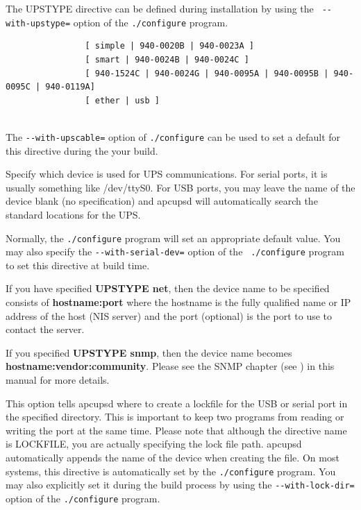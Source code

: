 {{{{{{{{{\begin{description}
The UPSTYPE directive can be defined during installation by using the {\tt
\verb{--{with-upstype=} option of the {\tt ./configure} program.  

\item [UPSCABLE \lt{}type of cable you are using\gt{}\gt{}]

\footnotesize
\begin{verbatim}
                [ simple | 940-0020B | 940-0023A ]
                [ smart | 940-0024B | 940-0024C ]
                [ 940-1524C | 940-0024G | 940-0095A | 940-0095B | 940-0095C | 940-0119A]
                [ ether | usb ]
     
\end{verbatim}
\normalsize

The {\tt \verb{--{with-upscable=} option of {\tt ./configure} can be used to set a
default for this directive during the your build.  

\item [DEVICE \lt{}name of device\gt{}]
   Specify which device is used for UPS communications. For serial ports, it is
usually something like /dev/ttyS0. For USB ports, you may leave the name of
the device blank (no specification) and apcupsd will automatically search the
standard locations for the UPS.  

Normally, the {\tt ./configure} program will set an appropriate default value.
You may also specify the {\tt \verb{--{with-serial-dev=} option of the {\tt
./configure} program to set this directive at build time.  

If you have specified {\bf UPSTYPE net}, then the device name to be specified
consists of {\bf hostname:port} where the hostname is the fully qualified name
or IP address of the host (NIS server) and the port (optional) is the port to
use to contact the server.  

If you specified {\bf UPSTYPE snmp}, then the device name becomes {\bf
hostname:vendor:community}. Please see the SNMP chapter (see 
) in this
manual for more details.  

\item [LOCKFILE \lt{}path to lockfile\gt{}]
   This option tells apcupsd where to create a lockfile for the USB or serial
port in the specified directory. This is important to keep two programs from
reading or writing the port at the same time. Please note that although the
directive name is LOCKFILE, you are actually specifying the lock file path.
apcupsd automatically appends the name of the device when creating the file.
On most systems, this directive is automatically set by the {\tt ./configure}
program.  You may also explicitly set it during the build process by using the
{\tt \verb{--{with-lock-dir=} option of the {\tt ./configure} program. 
\end{description}

}}}}}}}}}
